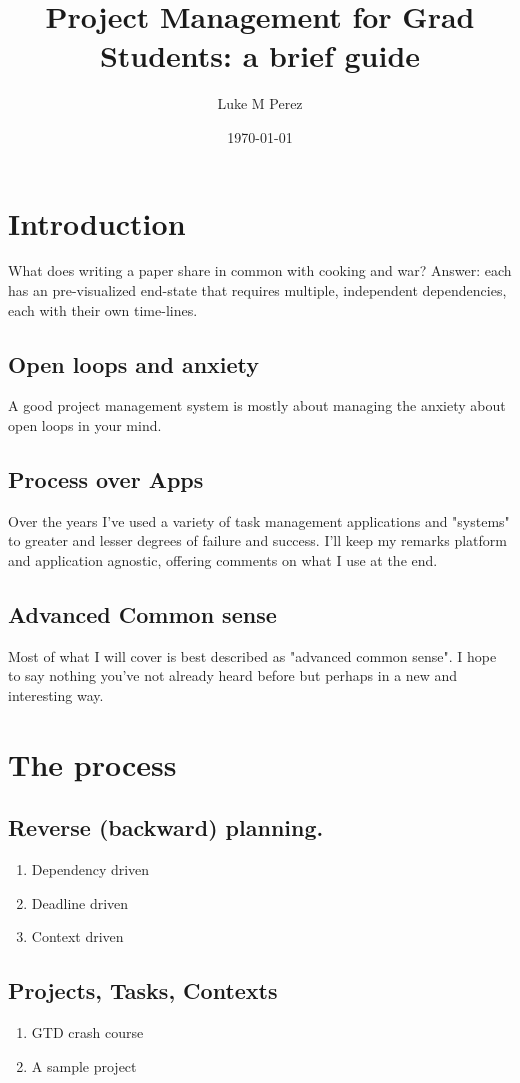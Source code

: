 \documentclass[11pt]{article}
\author{Luke M Perez}
\date{\today}
\title{Project Management for Grad Students: a brief guide}
\begin{document}
\maketitle

\section{Introduction}
\label{sec-1}
What does writing a paper share in common with cooking and war?
Answer: each has an pre-visualized end-state that requires multiple,
independent dependencies, each with their own time-lines.

\subsection{Open loops and anxiety}
\label{sec-1-1}
A good project management system is mostly about managing the anxiety
about open loops in your mind. 
\subsection{Process over Apps}
\label{sec-1-2}
Over the years I've used a variety of task management applications and
"systems" to greater and lesser degrees of failure and success. I'll
keep my remarks platform and application agnostic, offering comments
on what I use at the end.
\subsection{Advanced Common sense}
\label{sec-1-3}
Most of what I will cover is best described as "advanced common
sense". I hope to say nothing you've not already heard before but
perhaps in a new and interesting way.
\section{The process}
\label{sec-2}
\subsection{Reverse (backward) planning.}
\label{sec-2-1}
\begin{enumerate}
\item Dependency driven
\label{sec-2-1-1}
\item Deadline driven
\label{sec-2-1-2}
\item Context driven
\label{sec-2-1-3}
\end{enumerate}
\subsection{Projects, Tasks, Contexts}
\label{sec-2-2}
\begin{enumerate}
\item GTD crash course
\label{sec-2-2-1}
\item A sample project
\label{sec-2-2-2}
\end{enumerate}
\end{document}
